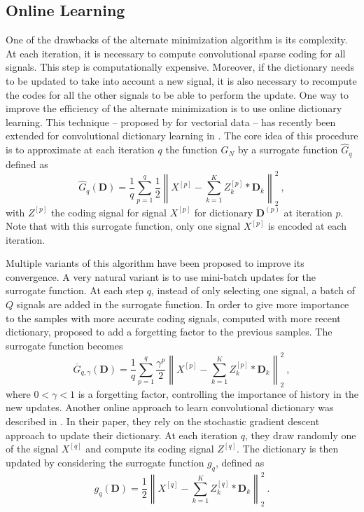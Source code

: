 \documentclass[../thesis.tex]{subfiles}
\begin{document}
\subsection{Online Learning}
\label{sub:dl_online}

	One of the drawbacks of the alternate minimization algorithm is its complexity. At each
	iteration, it is necessary to compute convolutional sparse coding for all signals.
	This step is computationally expensive. Moreover, if the
	dictionary needs to be updated to take into account a new signal, it is also necessary
	to recompute the codes for all the other signals to be able to perform the update. One
	way to improve the efficiency of the alternate minimization is to use online dictionary
	learning. This technique -- proposed by \citet{Mairal2010} for vectorial data -- has
	recently been extended for convolutional dictionary learning in \citet{Liu2017a}. The
	core idea of this procedure is to approximate at each iteration $q$ the function $G_N$
	by a surrogate function $\widehat G_q$ defined as
	\begin{equation}
		\widehat G_q(\pmb D) = \frac{1}{q}\sum_{p=1}^q\frac{1}{2} \left\|X^{[p]}
								- \sum_{k=1}^KZ^{[p]}_k* \pmb D_k\right\|_2^2~,
	\end{equation}
	with $Z^{[p]}$ the coding signal for signal $X^{[p]}$ for dictionary $\pmb D^{(p)}$
	at iteration $p$. Note that with this surrogate function, only one signal $X^{[p]}$
	is encoded at each iteration.

	Multiple variants of this algorithm have been proposed to improve its convergence.
	A very natural variant is to use mini-batch updates for the surrogate function. At
	each step $q$, instead of only selecting one signal, a batch of $Q$ signals are added
	in the surrogate function. In order to give more importance to the samples with more
	accurate coding signals, computed with more recent dictionary, \citet{Mairal2010}
	proposed to add a forgetting factor to the previous samples. The surrogate function
	becomes
	\begin{equation}
		\overline G_{q, \gamma}(\pmb D) = \frac{1}{q}\sum_{p=1}^q \frac{\gamma^p}{2} \left\|X^{[p]}
					- \sum_{k=1}^KZ^{[p]}_k* \pmb D_k\right\|_2^2~,
	\end{equation}
	where $0 < \gamma < 1$ is a forgetting factor, controlling the importance of history
	in the new updates.	Another online approach to learn convolutional dictionary
	was described in \citet{Kavukcuoglu2013}. In their paper, they rely
	on the stochastic gradient descent approach to update their dictionary. At each
	iteration $q$, they draw randomly one of the signal $X^{[q]}$ and compute its coding
	signal $Z^{[q]}$. The dictionary is then updated by considering the surrogate function
	$g_q$, defined as
	\begin{equation}
		g_q(\pmb D) = \frac{1}{2} \left\|X^{[q]} - \sum_{k=1}^KZ^{[q]}_k* \pmb D_k\right\|_2^2~.
	\end{equation}
	
\end{document}
